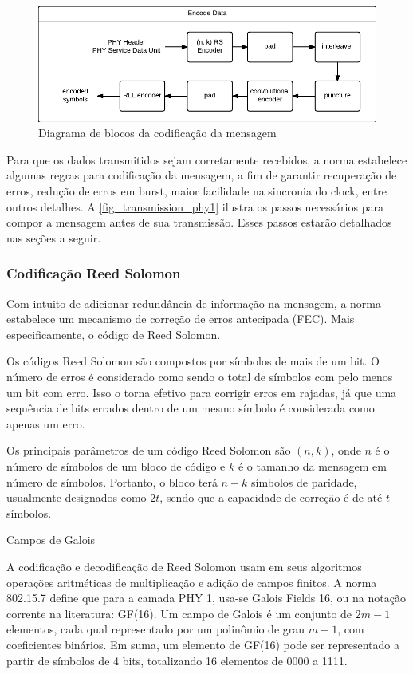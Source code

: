 		\begin{figure}[htb]
			\caption{\label{fig_transmission_phy1} Diagrama de blocos da codificação da mensagem}
			\centering
			\includegraphics[width=0.6\textheight]{PHY1-transmission.pdf}
		\end{figure}
		
	Para que os dados transmitidos sejam corretamente recebidos, a norma estabelece algumas regras para codificação da mensagem, a fim de garantir recuperação de erros, redução de erros em burst, maior facilidade na sincronia do clock, entre outros detalhes. A \autoref{fig_transmission_phy1} ilustra os passos necessários para compor a mensagem antes de sua transmissão. Esses passos estarão detalhados nas seções a seguir.
	
	
	\subsubsection{Codificação Reed Solomon}
	
	Com intuito de adicionar redundância de informação na mensagem, a norma estabelece um mecanismo de correção de erros antecipada (FEC). Mais especificamente, o código de Reed Solomon. 
	
	Os códigos Reed Solomon são compostos por símbolos de mais de um bit. O número de erros é considerado como sendo o total de símbolos com pelo menos um bit com erro. Isso o torna efetivo para corrigir erros em rajadas, já que uma sequência de bits errados dentro de um mesmo símbolo é considerada como apenas um erro. 
	
	Os principais parâmetros de um código Reed Solomon são $(n, k)$, onde $n$ é o número de símbolos de um bloco de código e $k$ é o tamanho da mensagem em número de símbolos. Portanto, o bloco terá $n - k$ símbolos de paridade, usualmente designados como $2t$, sendo que a capacidade de correção é de até $t$ símbolos.
	
	Campos de Galois
	
	A codificação e decodificação de Reed Solomon usam em seus algoritmos operações aritméticas de multiplicação e adição de campos finitos. A norma 802.15.7 define que para a camada PHY 1, usa-se Galois Fields 16, ou na notação corrente na literatura: GF(16). Um campo de Galois é um conjunto de $2m - 1$ elementos, cada qual representado por um polinômio de grau $m - 1$, com coeficientes binários. Em suma, um elemento de GF(16) pode ser representado a partir de símbolos de 4 bits, totalizando 16 elementos de 0000 a 1111. 
	
